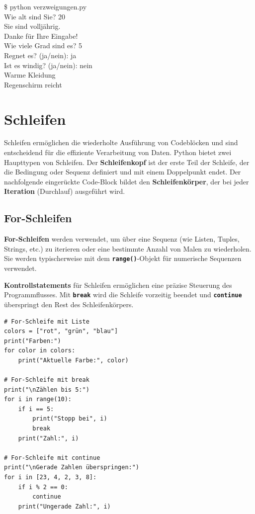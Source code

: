 \documentclass[ngerman,11pt]{article}
\begin{document}
\begin{tcolorbox}[colback=gray!15, fontupper=\ttfamily, boxrule=0.5pt,
    left=3mm, right=3mm, top=2mm, bottom=2mm]
\$ python verzweigungen.py\\
Wie alt sind Sie? 20\\
Sie sind volljährig.\\
Danke für Ihre Eingabe!\\
Wie viele Grad sind es? 5\\
Regnet es? (ja/nein): ja\\
Ist es windig? (ja/nein): nein\\
Warme Kleidung\\
Regenschirm reicht
\end{tcolorbox}

\section{Schleifen}
Schleifen ermöglichen die wiederholte Ausführung von Codeblöcken und sind entscheidend für die effiziente Verarbeitung von Daten. Python bietet zwei Haupttypen von Schleifen. Der \textbf{Schleifenkopf} ist der erste Teil der Schleife, der die Bedingung oder Sequenz definiert und mit einem Doppelpunkt endet. Der nachfolgende eingerückte Code-Block bildet den \textbf{Schleifenkörper}, der bei jeder \textbf{Iteration} (Durchlauf) ausgeführt wird.

\subsection{For-Schleifen}

\textbf{For-Schleifen} werden verwendet, um über eine Sequenz (wie Listen, Tuples, Strings, etc.) zu iterieren oder eine bestimmte Anzahl von Malen zu wiederholen. Sie werden typischerweise mit dem \textbf{\texttt{range()}}-Objekt für numerische Sequenzen verwendet.

\textbf{Kontrollstatements} für Schleifen ermöglichen eine präzise Steuerung des Programmflusses. Mit \textbf{\texttt{break}} wird die Schleife vorzeitig beendet und \textbf{\texttt{continue}} überspringt den Rest des Schleifenkörpers.

\begin{lstlisting}[caption=for\_schleifen.py]
# For-Schleife mit Liste
colors = ["rot", "grün", "blau"]
print("Farben:")
for color in colors:
    print("Aktuelle Farbe:", color)

# For-Schleife mit break
print("\nZählen bis 5:")
for i in range(10):
    if i == 5:
        print("Stopp bei", i)
        break
    print("Zahl:", i)

# For-Schleife mit continue
print("\nGerade Zahlen überspringen:")
for i in [23, 4, 2, 3, 8]:
    if i % 2 == 0:
        continue
    print("Ungerade Zahl:", i)
\end{lstlisting}
\end{document}
